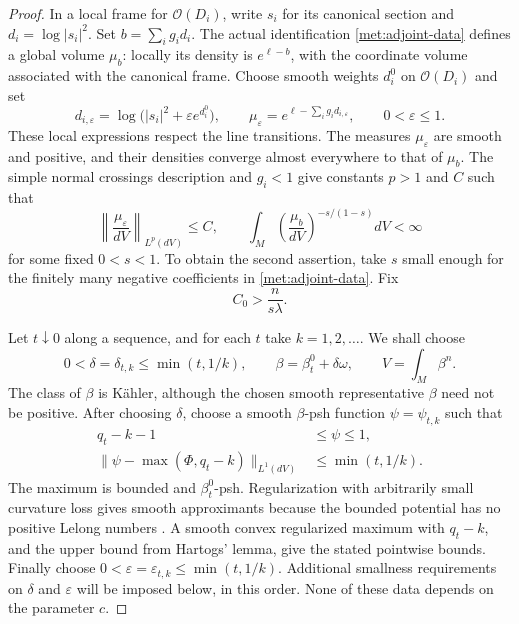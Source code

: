 \documentclass[11pt,letterpaper]{article}
\newcommand{\OO}{\mathcal{O}}
\theoremstyle{definition}
\theoremstyle{remark}
\begin{document}
\begin{proof}
In a local frame for \(\OO(D_i)\), write \(s_i\) for its canonical
section and \(d_i=\log|s_i|^2\).  Set \(b=\sum_i g_i d_i\).
The actual identification \eqref{met:adjoint-data} defines a global
volume \(\mu_b\): locally its density is \(e^{\ell-b}\), with the
coordinate volume associated with the canonical frame.  Choose smooth
weights \(d_i^0\) on \(\OO(D_i)\) and set
\begin{equation}
 \label{met:regularized-density}
 d_{i,\varepsilon}
   =\log\bigl(|s_i|^2+\varepsilon e^{d_i^0}\bigr),
 \qquad
 \mu_\varepsilon=e^{\ell-\sum_i g_i d_{i,\varepsilon}},
 \qquad 0<\varepsilon\leq1.
\end{equation}
These local expressions respect the line transitions.  The measures
\(\mu_\varepsilon\) are smooth and positive, and their densities converge
almost everywhere to that of \(\mu_b\).  The simple normal crossings
description and \(g_i<1\) give constants \(p>1\) and \(C\) such that
\begin{equation}
 \label{met:density-moments}
 \left\|\frac{\mu_\varepsilon}{dV}\right\|_{L^p(dV)}\leq C,
 \qquad
 \int_M\left(\frac{\mu_b}{dV}\right)^{-s/(1-s)}dV<\infty
\end{equation}
for some fixed \(0<s<1\).  To obtain the second assertion, take \(s\)
small enough for the finitely many negative coefficients in
\eqref{met:adjoint-data}.  Fix
\begin{equation}
 \label{met:C-zero}
 C_0>\frac{n}{s\lambda}.
\end{equation}

Let \(t\downarrow0\) along a sequence, and for each \(t\) take
\(k=1,2,\ldots\).  We shall choose
\[
 0<\delta=\delta_{t,k}\leq\min(t,1/k),
 \qquad
 \beta=\beta_t^0+\delta\omega,
 \qquad
 V=\int_M\beta^n.
\]
The class of \(\beta\) is K\"ahler, although the chosen smooth
representative \(\beta\) need not be positive.  After choosing
\(\delta\), choose a smooth \(\beta\)-psh function \(\psi=\psi_{t,k}\)
such that
\begin{equation}
 \label{met:psi-approximation}
 \begin{split}
 q_t-k-1&\leq\psi\leq1,\\
 \bigl\|\psi-\max(\Phi,q_t-k)\bigr\|_{L^1(dV)}
    &\leq\min(t,1/k).
 \end{split}
\end{equation}
The maximum is bounded and \(\beta_t^0\)-psh.  Regularization with
arbitrarily small curvature loss gives smooth approximants because
the bounded potential has no positive Lelong numbers
\cite{DemaillyRegularization}.  A smooth convex regularized maximum with
\(q_t-k\), and the upper bound from Hartogs' lemma, give the stated
pointwise bounds.  Finally choose
\(0<\varepsilon=\varepsilon_{t,k}\leq\min(t,1/k)\).
Additional smallness requirements on \(\delta\) and \(\varepsilon\)
will be imposed below, in this order.  None of these data depends on
the parameter \(c\).


\end{proof}
\end{document}
